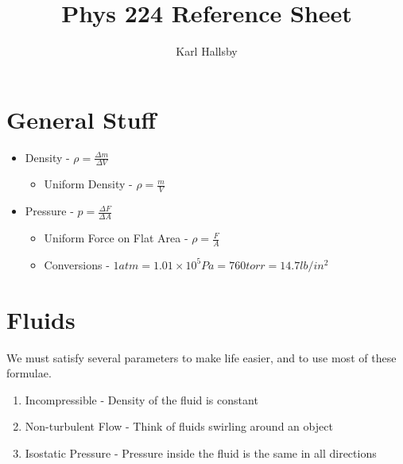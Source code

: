 \documentclass[10pt,letterpaper,final,twoside,notitlepage]{article}
\author{Karl Hallsby}
\title{Phys 224 Reference Sheet}
\begin{document}
\section*{General Stuff} \label{sec:General}
	\begin{itemize}[noitemsep]
		\item Density - $\rho = \frac{\Delta m}{\Delta V}$
			\begin{itemize}
				\item Uniform Density - $\rho = \frac{m}{V}$
			\end{itemize}
		
		\item Pressure - $p = \frac{\Delta F}{\Delta A}$
			\begin{itemize}
				\item Uniform Force on Flat Area - $\rho = \frac{F}{A}$
				\item Conversions - $1 atm = 1.01 \times 10^5 Pa = 760 torr = 14.7 lb/in^2$
			\end{itemize}
	\end{itemize}

\section*{Fluids} \label{sec:Fluids}
We must satisfy several parameters to make life easier, and to use most of these formulae.
	\begin{enumerate}[noitemsep]
		\item Incompressible - Density of the fluid is constant
		\item Non-turbulent Flow - Think of fluids swirling around an object
		\item Isostatic Pressure - Pressure inside the fluid is the same in all directions
	\end{enumerate}
\end{document}
